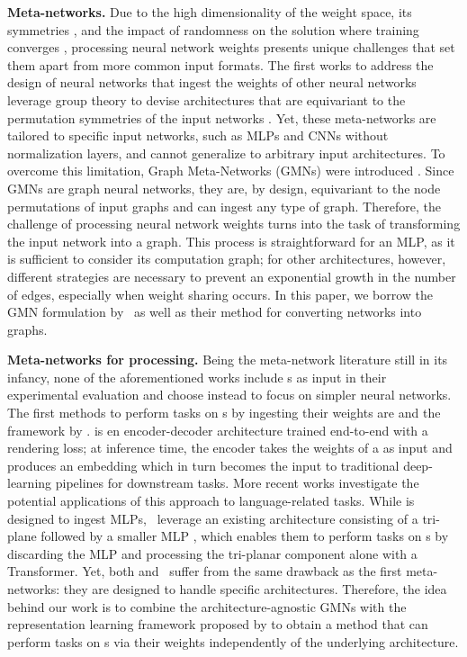 \textbf{Meta-networks.} 
Due to the high dimensionality of the weight space, its symmetries \cite{hecht1990algebraic}, and the impact of randomness on the solution where training converges \cite{entezari2022the, ainsworth2023git}, processing neural network weights presents unique challenges that set them apart from more common input formats. The first works to address the design of neural networks that ingest the weights of other neural networks leverage group theory to devise architectures that are equivariant to the permutation symmetries of the input networks \cite{navon2023equivariant, zhou2023permutation, zhou2023neural}. Yet, these meta-networks are tailored to specific input networks, such as MLPs and CNNs without normalization layers, and cannot generalize to arbitrary input architectures. 
To overcome this limitation, Graph Meta-Networks (GMNs) were introduced \cite{lim2024graph, kofinas2024graph}. Since GMNs are graph neural networks, they are, by design, equivariant to the node permutations of input graphs and can ingest any type of graph. Therefore, the challenge of processing neural network weights turns into the task of transforming the input network into a graph. This process is straightforward for an MLP, as it is sufficient to consider its computation graph; for other architectures, however, different strategies are necessary to prevent an exponential growth in the number of edges, especially when weight sharing occurs. In this paper, we borrow the GMN formulation by \citealp{lim2024graph}\ as well as their method for converting networks into graphs.

\textbf{Meta-networks for \nerf{} processing.}
Being the meta-network literature still in its infancy, none of the aforementioned works include \nerf{}s as input in their experimental evaluation and choose instead to focus on simpler neural networks. The first methods to perform tasks on \nerf{}s by ingesting their weights are \nftovec{} \cite{ramirez2024deep} and the framework by \citealp{cardace2024neural}. \nftovec{} is en encoder-decoder architecture trained end-to-end with a rendering loss; at inference time, the encoder takes the weights of a \nerf{} as input and produces an embedding which in turn becomes the input to traditional deep-learning pipelines for downstream tasks. More recent works \cite{ballerini2024connecting, amaduzzi2024llana} investigate the potential applications of this approach to language-related tasks. While \nftovec{} is designed to ingest MLPs, \citeauthor{cardace2024neural}\ leverage an existing \nerf{} architecture consisting of a tri-plane followed by a smaller MLP \cite{chan2022efficient}, which enables them to perform tasks on \nerf{}s by discarding the MLP and processing the tri-planar component alone with a Transformer. Yet, both \nftovec{} and \citeauthor{cardace2024neural}\ suffer from the same drawback as the first meta-networks: they are designed to handle specific \nerf{} architectures. Therefore, the idea behind our work is to combine the architecture-agnostic GMNs with the representation learning framework proposed by \citeauthor{ramirez2024deep} to obtain a method that can perform tasks on \nerf{}s via their weights independently of the underlying architecture.

